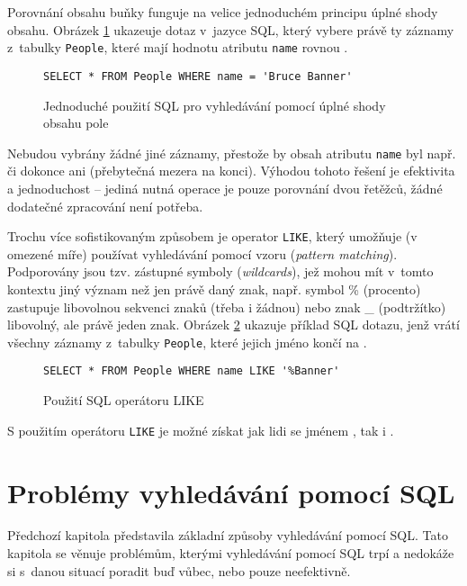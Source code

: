 \documentclass[11pt,oneside]{fithesis2}
\begin{document}
Porovnání obsahu buňky funguje na velice jednoduchém principu úplné shody obsahu. Obrázek \ref{SQLexample1} ukazeuje dotaz v~jazyce SQL, který vybere právě ty záznamy z~tabulky \texttt{People}, které mají hodnotu atributu \texttt{name} rovnou . 
\begin{figure}[!htbp]
\begin{lstlisting}[frame=single]
SELECT * FROM People WHERE name = 'Bruce Banner'
\end{lstlisting}
\caption{Jednoduché použití SQL pro vyhledávání pomocí úplné shody obsahu pole}
\label{SQLexample1}
\end{figure}

Nebudou vybrány žádné jiné záznamy, přestože by obsah atributu \texttt{name} byl např.  či dokonce ani  (přebytečná mezera na konci). Výhodou tohoto řešení je efektivita a jednoduchost -- jediná nutná operace je 
pouze porovnání dvou řetěžců, žádné dodatečné zpracování není potřeba. 

Trochu více sofistikovaným způsobem je operator \texttt{LIKE}, který umožňuje (v omezené míře) používat vyhledávání pomocí vzoru (\emph{pattern matching}). Podporovány jsou tzv. zástupné symboly (\emph{wildcards}), jež mohou mít v~tomto kontextu jiný význam než jen právě daný znak, např. symbol \% (procento) zastupuje libovolnou sekvenci znaků (třeba i žádnou) nebo znak \_ (podtržítko) libovolný, ale právě jeden znak. Obrázek \ref{SQLexample2} ukazuje příklad SQL dotazu, jenž vrátí všechny záznamy z~tabulky \texttt{People}, které jejich jméno končí na .
\begin{figure}[!htbp]
\begin{lstlisting}[frame=single]
SELECT * FROM People WHERE name LIKE '%Banner'
\end{lstlisting}
\caption{Použití SQL operátoru LIKE}
\label{SQLexample2}
\end{figure}

S použitím operátoru \texttt{LIKE} je možné získat jak lidi se jménem , tak i . 

\section{Problémy vyhledávání pomocí SQL}
\label{ProblemyVyhledavaniSQL}
Předchozí kapitola představila základní způsoby vyhledávání pomocí SQL. Tato kapitola se věnuje problémům, kterými vyhledávání pomocí SQL trpí a nedokáže si s~danou situací poradit buď vůbec, nebo pouze neefektivně.
\end{document}
